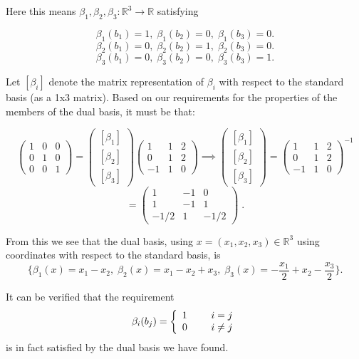 \documentclass[11pt]{article}
\begin{document}
Here this means $\beta_1,\beta_2,\beta_3 : \mathbb{R}^3 \rightarrow \mathbb{R}$ satisfying

$$\beta_1(b_1) = 1 ,\; \beta_1(b_2) = 0, \; \beta_1(b_3) = 0.$$
$$\beta_2(b_1) = 0 ,\; \beta_2(b_2) = 1, \; \beta_2(b_3) = 0.$$
$$\beta_3(b_1) = 0 ,\; \beta_3(b_2) = 0, \; \beta_3(b_3) = 1.$$

Let $[\beta_i]$ denote the matrix representation of $\beta_i$ with respect to the standard basis (as a 1x3 matrix). Based on our requirements for the properties of the members of the dual basis, it must be that:

$$\begin{pmatrix}
1&0&0\\ 0&1&0\\ 0&0&1
\end{pmatrix} = \begin{pmatrix}
[\beta_1] \\ [\beta_2] \\ [\beta_3]
\end{pmatrix} \begin{pmatrix}
1&1&2 \\ 0&1&2 \\ -1&1&0
\end{pmatrix} \implies \begin{pmatrix}
[\beta_1] \\ [\beta_2] \\ [\beta_3]
\end{pmatrix} = \begin{pmatrix}
1&1&2 \\ 0&1&2 \\ -1&1&0
\end{pmatrix}^{-1}$$ $$ =\begin{pmatrix}
1&-1&0\\ 1 & -1 & 1 \\ -1/2 &1 & -1/2
\end{pmatrix}\;.$$

From this we see that the dual basis, using $x = (x_1,x_2,x_3) \in \mathbb{R}^3$ using coordinates with respect to the standard basis, is
$$ \{\beta_1(x) = x_1-x_2,\; \beta_2(x) = x_1-x_2 + x_3,\; \beta_3(x) = -\frac{x_1}{2}+x_2 - \frac{x_3}{2}\}.$$

It can be verified that the requirement \begin{align*}
\beta_i(b_j) = \left\{ \begin{array}{cc} 
                1 & \hspace{5mm} i=j \\
                0 & \hspace{5mm} i\neq j \\
                \end{array} \right.
\end{align*} is in fact satisfied by the dual basis we have found. 
\end{document}
